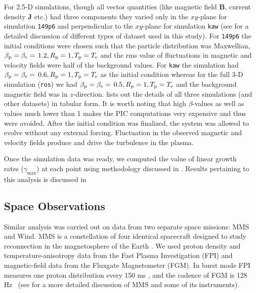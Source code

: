             For 2.5-D simulations, though all vector quantities (like magnetic field $\mathbf{B}$,
            current density $\mathbf{J}$ etc.) had three components they varied only in the
            $xy$-plane for simulation \texttt{149p6} and perpendicular to the $xy$-plane for
            simulation \texttt{kaw} (see  for a detailed discussion of different
            types of dataset used in this study). For \texttt{149p6} the initial conditions were
            chosen such that the particle distribution was Maxwellian, $\beta_{\rm p}=\beta_{\rm
            e}=\, 1.2, R_{\rm p}=1, T_{\rm p} = T_{\rm e}$ and the rms value of fluctuations in
            magnetic and velocity fields were half of the background values. For \texttt{kaw} the
            simulation had $\beta_{\rm p}=\beta_{\rm e}=\, 0.6, R_{\rm p}=1, T_{\rm p} = T_{\rm e}$
            as the initial condition whereas for the full 3-D simulation (\texttt{ros}) we had
            $\beta_{\rm p}=\beta_{\rm e}=\, 0.5, R_{\rm p}=1, T_{\rm p} = T_{\rm e}$ and the
            background magnetic field was in $z$-direction.  lists out the
            details of all three simulations (and other datasets) in tabular form. It is worth
            noting that high $\beta$-values as well as values much lower than 1 makes the PIC
            computations very expensive and thus were avoided. After the initial condition was
            finalized, the system was allowed to evolve without any external forcing. Fluctuation in
            the observed magnetic and velocity fields produce and drive the turbulence in the
            plasma.

            Once the simulation data was ready, we computed the value of linear growth rates
            ($\gamma_{\max}$) at each point using methodology discussed in . Results
            pertaining to this analysis is discussed in 

        \subsection{Space Observations}\label{sec:sco5}

            Similar analysis was carried out on data from two separate space missions: MMS and Wind.
            MMS is a constellation of four identical spacecraft designed to study reconnection in
            the magnetosphere of the Earth \citep{Burch2016}. We used proton density and
            temperature-anisotropy data from the Fast Plasma Investigation (FPI) and magnetic-field
            data from the Fluxgate Magnetometer (FGM). In burst mode FPI measures one proton
            distribution every 150 ms \citep{Pollock2016}, and the cadence of FGM is 128 Hz~
            \citep{Russell2016} (see  for a more detailed discussion of MMS and some
            of its instruments).

